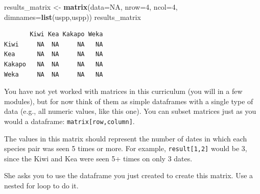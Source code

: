 \documentclass[
]{book}
\newenvironment{Shaded}{\begin{snugshade}}{\end{snugshade}}
\newcommand{\DataTypeTok}[1]{\textcolor[rgb]{0.13,0.29,0.53}{#1}}
\newcommand{\DecValTok}[1]{\textcolor[rgb]{0.00,0.00,0.81}{#1}}
\newcommand{\KeywordTok}[1]{\textcolor[rgb]{0.13,0.29,0.53}{\textbf{#1}}}
\newcommand{\NormalTok}[1]{#1}
\newcommand{\OtherTok}[1]{\textcolor[rgb]{0.56,0.35,0.01}{#1}}
\newcommand{\StringTok}[1]{\textcolor[rgb]{0.31,0.60,0.02}{#1}}
\begin{document}
\begin{Shaded}
\begin{Highlighting}[]
\NormalTok{results_matrix <-}\StringTok{ }\KeywordTok{matrix}\NormalTok{(}\DataTypeTok{data=}\OtherTok{NA}\NormalTok{, }\DataTypeTok{nrow=}\DecValTok{4}\NormalTok{, }\DataTypeTok{ncol=}\DecValTok{4}\NormalTok{, }\DataTypeTok{dimnames=}\KeywordTok{list}\NormalTok{(uspp,uspp))}
\NormalTok{results_matrix}
\end{Highlighting}
\end{Shaded}

\begin{verbatim}
       Kiwi Kea Kakapo Weka
Kiwi     NA  NA     NA   NA
Kea      NA  NA     NA   NA
Kakapo   NA  NA     NA   NA
Weka     NA  NA     NA   NA
\end{verbatim}

You have not yet worked with matrices in this curriculum (you will in a few modules), but for now think of them as simple dataframes with a single type of data (e.g., all numeric values, like this one). You can subset matrices just as you would a dataframe: \texttt{matrix{[}row,column{]}}.

The values in this matrix should represent the number of dates in which each species pair was seen 5 times or more. For example, \texttt{result{[}1,2{]}} would be 3, since the Kiwi and Kea were seen 5+ times on only 3 dates.

She asks you to use the dataframe you just created to create this matrix. Use a nested for loop to do it.
\end{document}
